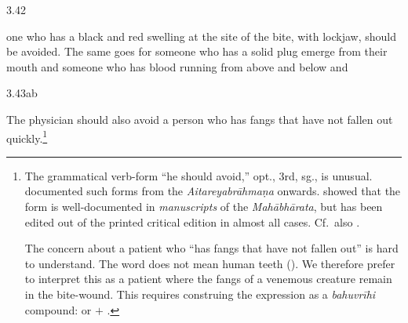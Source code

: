 \begin{translation}[resume]
\item[3.42]

one who has a black and red swelling at the site of the bite, with lockjaw,
should be avoided.  The same goes for someone who has a solid plug emerge
from their mouth  and someone who has blood running from above and below and

\item[3.43ab]

The physician should also avoid a person who has fangs that have not fallen
out quickly.\footnote{The grammatical verb-form  “he
should avoid,” opt., 3rd, sg., is unusual. \citet[10\,ff]{reno-1940}
documented such forms from the \emph{Aitareyabrāhmaṇa} onwards.  \citet[\P
6.3.3 “Peculiar optative endings”, pp.\,176--177]{ober-2003} showed that the
form is well-documented in \emph{manuscripts} of the \emph{Mahābhārata}, but
has been edited out of the printed critical edition in almost all cases. 
Cf.\ also \cite{kuli-2006}.

The concern about a patient who “has fangs that have not fallen out” is hard
to understand.  The word  does not mean human teeth
().  We therefore prefer to interpret this as a patient where the
fangs of a venemous creature remain in the bite-wound.  This requires
construing the expression as a \emph{bahuvrīhi} compound: 
 or  $+$
.}


\end{translation}